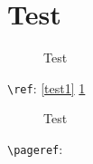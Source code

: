 \documentclass{article}
\begin{document}
\section{Test}

\begin{figure}
\label{test1}
\caption{Test}
\label{test2}
\end{figure}

\noindent\verb|\ref|: \ref{test1} \ref{test2}

\begin{figure}
\caption*{Test}
\label{test3}
\end{figure}

\noindent\verb|\pageref|: \pageref{test3}
\end{document}
